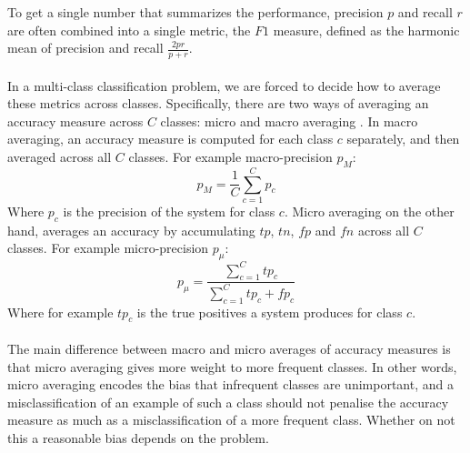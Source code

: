 To get a single number that summarizes the performance, precision $p$ and recall $r$ are often combined into a single metric, the $F1$ measure, defined as the harmonic mean of precision and recall $\frac{2pr}{p + r}$.
\\\\
In a multi-class classification problem, we are forced to decide how to average these metrics across classes. Specifically, there are two ways of averaging an accuracy measure across $C$ classes: micro and macro averaging \citep{sokolova2009}. In macro averaging, an accuracy measure is computed for each class $c$ separately, and then averaged across all $C$ classes. For example macro-precision $p_{M}$:
$$
p_{M} = \frac{1}{C}\sum_{c=1}^C p_c
$$
Where $p_c$ is the precision of the system for class $c$. Micro averaging on the other hand, averages an accuracy by accumulating $tp$, $tn$, $fp$ and $fn$ across all $C$ classes. For example micro-precision $p_{\mu}$:
$$
p_\mu = \frac{\sum\limits_{c=1}^C tp_c}{\sum\limits_{c=1}^C tp_c + fp_c}
$$
Where for example $tp_c$ is the true positives a system produces for class $c$.
\\\\
The main difference between macro and micro averages of accuracy measures is that micro averaging gives more weight to more frequent classes. In other words, micro averaging encodes the bias that infrequent classes are unimportant, and a misclassification of an example of such a class should not penalise the accuracy measure as much as a misclassification of a more frequent class. Whether on not this a reasonable bias depends on the problem.